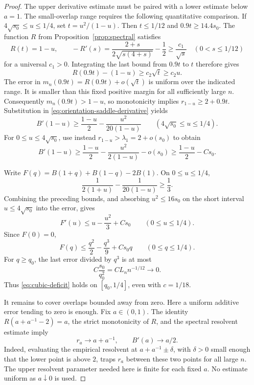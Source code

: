 \begin{proof}
The upper derivative estimate must be paired with a lower estimate
below $a=1$. The small-overlap range requires the following quantitative
comparison. If
$4\sqrt{s_0}\le u\le1/4$, set $t=u^2/(1-u)$.  Then $t\le1/12$ and
$0.9t\ge14.4s_0$.  The function $R$ from
Proposition~\ref{prop:spectral} satisfies
\[
 R(t)=1-u,\qquad
 -R'(s)=\frac{2+s}{2\sqrt{s(4+s)}}-\frac12
        \ge \frac{c_1}{\sqrt{s}}
        \quad(0<s\le1/12)
\]
for a universal $c_1>0$.  Integrating the last bound from $0.9t$ to $t$
therefore gives
\[
 R(0.9t)-(1-u)\ge c_2\sqrt{t}\ge c_2u.
\]
The error in $m_n(0.9t)=R(0.9t)+o(\sqrt{t})$ is uniform over the indicated
range.  It is smaller than this fixed positive margin for all sufficiently
large $n$.  Consequently $m_n(0.9t)>1-u$, so monotonicity implies
$r_{1-u}\ge2+0.9t$.  Substitution in
\eqref{eq:orientation-saddle-derivative} yields
\begin{equation}
 B'(1-u)\ge\frac{1-u}{2}-\frac{u^2}{20(1-u)}
 \qquad(4\sqrt{s_0}\le u\le1/4).
 \label{eq:orientation-subcritical-derivative}
\end{equation}
For $0\le u\le4\sqrt{s_0}$, use instead
$r_{1-u}>\lambda_1=2+o(s_0)$ to obtain
\[
 B'(1-u)
 \ge\frac{1-u}{2}-\frac{u^2}{2(1-u)}-o(s_0)
 \ge\frac{1-u}{2}-Cs_0.
\]

Write $F(q)=B(1+q)+B(1-q)-2B(1)$.  On $0\le u\le1/4$,
\[
 \frac1{2(1+u)}-\frac1{20(1-u)}\ge\frac13.
\]
Combining the preceding bounds, and absorbing $u^2\le16s_0$ on the short
interval $u\le4\sqrt{s_0}$ into the error, gives
\[
 F'(u)\le u-\frac{u^2}{3}+Cs_0
 \qquad(0\le u\le1/4).
\]
Since $F(0)=0$,
\begin{equation}
 F(q)\le\frac{q^2}{2}-\frac{q^3}{9}+Cs_0q
 \qquad(0\le q\le1/4).
 \label{eq:orientation-small-overlap-deficit}
\end{equation}
For $q\ge q_0$, the last error divided by $q^3$ is at most
\[
 C\frac{s_0}{q_0^2}=CL_n n^{-1/12}\longrightarrow0.
\]
Thus \eqref{eq:cubic-deficit} holds on $[q_0,1/4]$, even with $c=1/18$.

It remains to cover overlaps bounded away from zero. Here a
uniform additive error tending to zero is enough. Fix
$a\in(0,1)$. The identity
$R(a+a^{-1}-2)=a$, the strict monotonicity of $R$, and the spectral resolvent
estimate imply
\[
 r_a\longrightarrow a+a^{-1},
 \qquad B'(a)\longrightarrow a/2.
\]
Indeed, evaluating the empirical resolvent at
$a+a^{-1}\pm\delta$, with $\delta>0$ small enough that the lower point is
above $2$, traps $r_a$ between these two points for all large $n$.
The upper resolvent parameter needed here is finite for each fixed $a$.
No estimate uniform as $a\downarrow0$ is used.


\end{proof}
